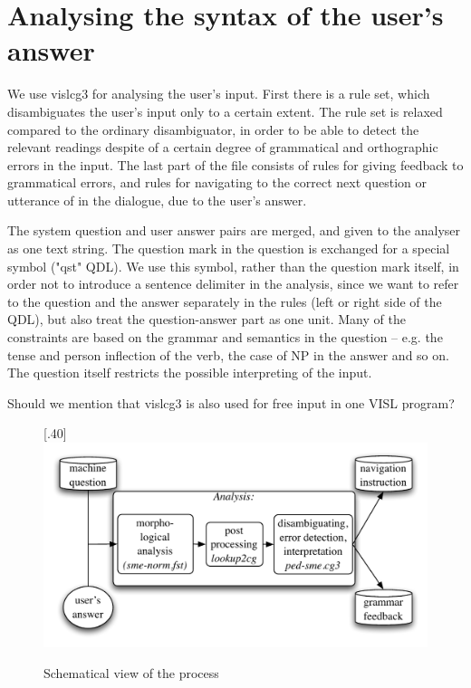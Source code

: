 \documentclass[11pt]{article}
\begin{document}
\section{Analysing the syntax of the user's answer} 
We use vislcg3 for analysing the user's input. First there is a rule set, which disambiguates the user's input only to a certain extent. The rule set is relaxed compared to the ordinary disambiguator, in order to be able to detect the relevant readings despite of a certain degree of grammatical and orthographic errors in the input. The last part of the file consists of rules for giving feedback to grammatical errors, and rules for navigating to the correct next question or utterance of in the dialogue, due to the user's answer.  

The system question and user answer pairs are merged, and given to the analyser as one text string. The question mark in the question is exchanged for a special symbol ("qst" QDL). We use this symbol, rather than the question mark itself, in order not to introduce a sentence delimiter in the analysis, since we want to refer to the question and the answer separately in the rules (left or right side of the QDL), but also treat the question-answer part as one unit. Many of the constraints are based on the grammar and semantics in the question -- e.g. the tense and person inflection of the verb, the case of NP in the answer and so on. The question itself restricts the possible interpreting of the input.

Should we mention that vislcg3 is also used for free input in one VISL program?

\begin{figure}%
\begin{center}
\scalebox{.40}[.40]{\includegraphics{presentation/img/qa2.pdf}}\\
\caption{Schematical view of the process}
\end{center}
\end{figure}
\end{document}
